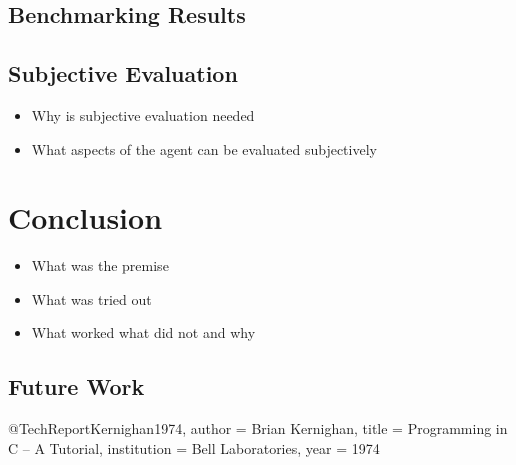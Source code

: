 \documentclass[english, version-2022-01]{uzl-thesis}
\begin{document}
\section{Benchmarking Results}

\section{Subjective Evaluation}

\begin{itemize}
	\item Why is subjective evaluation needed
	\item What aspects of the agent can be evaluated subjectively
\end{itemize}

\chapter{Conclusion}

\begin{itemize}
	\item What was the premise
	\item What was tried out
	\item What worked what did not and why
\end{itemize}

\section{Future Work}

\begin{bibtex-entries}
@TechReport{Kernighan1974,
	author = {Brian Kernighan},
	title = {Programming in C – A Tutorial},
	institution = {Bell Laboratories},
	year = {1974}
}
\end{bibtex-entries}
\end{document}
